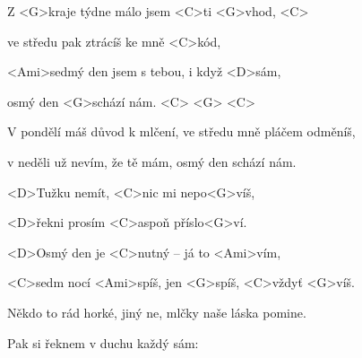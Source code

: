 

\zs
Z <G>kraje týdne málo jsem <C>ti <G>vhod, <C>

ve středu pak ztrácíš ke mně <C>kód,

<Ami>sedmý den jsem s tebou, i když <D>sám,

osmý den <G>schází nám. <C> <G> <C>
\ks

\zs
V pondělí máš důvod k mlčení, ve středu mně pláčem odměníš,

v neděli už nevím, že tě mám, osmý den schází nám.
\ks

\zr
<D>Tužku nemít, <C>nic mi nepo<G>víš,

<D>řekni prosím <C>aspoň příslo<G>ví.

<D>Osmý den je <C>nutný -- já to <Ami>vím,

<C>sedm nocí <Ami>spíš, jen <G>spíš, <C>vždyť <G>víš.
\kr

\zs
Někdo to rád horké, jiný ne, mlčky naše láska pomine.

Pak si řeknem v duchu každý sám: 
\ks

\zr\kr

\kp
